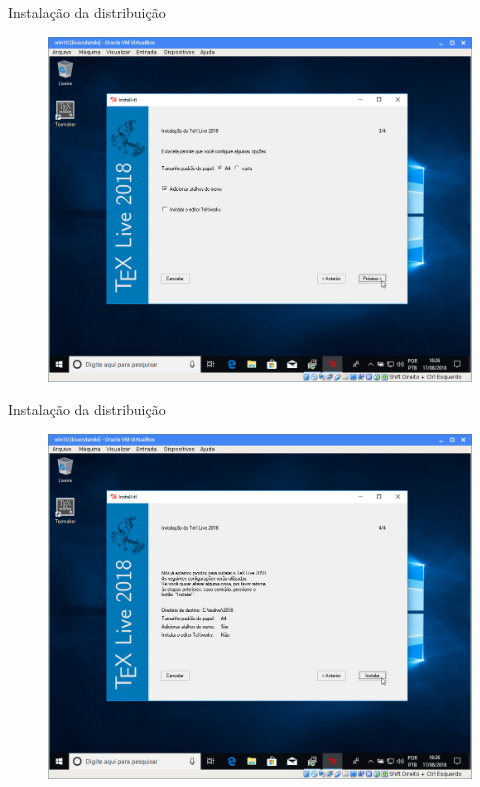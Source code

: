 \documentclass{beamer}
\begin{document}
\begin{frame}{Instala\c{c}\~ao da distribui\c{c}\~ao}
    \begin{figure}[h]
        \includegraphics[scale=0.25]{fig/texlive-06.png}
    \end{figure}
\end{frame}

\begin{frame}{Instala\c{c}\~ao da distribui\c{c}\~ao}
    \begin{figure}[h]
        \includegraphics[scale=0.25]{fig/texlive-07.png}
    \end{figure}
\end{frame}
\end{document}

